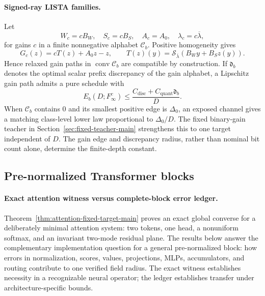 \documentclass[twoside,11pt]{article}
\newcommand{\soft}{\mathcal{S}}
\begin{document}
\paragraph{Signed-ray LISTA families.}
Let
\begin{equation}
 W_c=cB_W,
 \quad S_c=cB_S,
 \quad A_c=A_0,
 \quad \lambda_c=c\overline\lambda,
 \label{eq:signed-ray-parameters-main}
\end{equation}
for gains $c$ in a finite nonnegative alphabet $\mathcal C_b$.  Positive homogeneity gives
\begin{equation}
 G_c(z)=cT(z)+A_0z-z,
 \qquad
 T(z)(y)=\soft_{\overline\lambda}(B_Wy+B_Sz(y)).
 \label{eq:signed-ray-field-main}
\end{equation}
Hence relaxed gain paths in $\operatorname{conv}\mathcal C_b$ are compatible by construction.  If $\mathfrak d_b$ denotes the optimal scalar prefix discrepancy of the gain alphabet, a Lipschitz gain path admits a pure schedule with
\begin{equation}
 E_b(D;F_\infty^c)
 \le\frac{C_{\mathrm{disc}}+C_{\mathrm{quant}}\mathfrak d_b}{D}.
 \label{eq:signed-ray-upper-main}
\end{equation}
When $\mathcal C_b$ contains $0$ and its smallest positive edge is $\Delta_0$, an exposed channel gives a matching class-level lower law proportional to $\Delta_0/D$.  The fixed binary-gain teacher in Section~\ref{sec:fixed-teacher-main} strengthens this to one target independent of $D$.  The gain edge and discrepancy radius, rather than nominal bit count alone, determine the finite-depth constant.

\subsection{Pre-normalized Transformer blocks}
\label{sec:transformer-specialization-main}

\paragraph{Exact attention witness versus complete-block error ledger.}
Theorem~\ref{thm:attention-fixed-target-main} proves an exact global converse
for a deliberately minimal attention system: two tokens, one head, a
nonuniform softmax, and an invariant two-mode residual plane.  The results
below answer the complementary implementation question for a general
pre-normalized block: how errors in normalization, scores, values,
projections, MLPs, accumulators, and routing contribute to one verified field
radius.  The exact witness establishes necessity in a recognizable neural
operator; the ledger establishes transfer under architecture-specific bounds.
\end{document}

